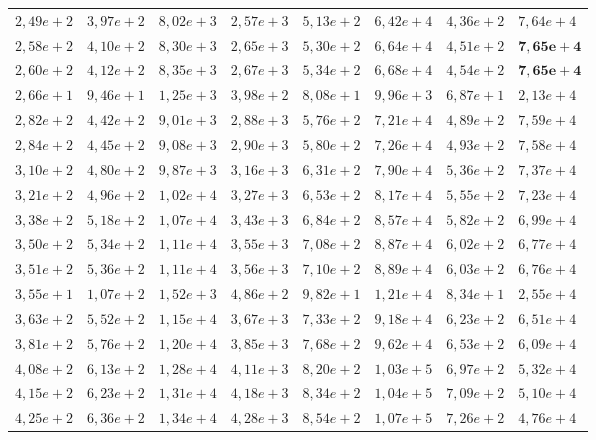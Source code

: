 \documentclass [11pt]{articleSBPO}
\begin{document}
\begin{table}
\begin{tabular}{|m{1.3cm}|m{1.3cm}|m{1.3cm}|m{1.3cm}|m{1.3cm}|m{1.3cm}|m{1.3cm}||m{1.5cm}|}
		 $ 2,49e+2 $ & $ 3,97e+2 $ & $ 8,02e+3 $ & $ 2,57e+3 $ & $ 5,13e+2 $ & $ 6,42e+4 $ & $ 4,36e+2 $ & $ 7,64e+4 $ \\
		 $ 2,58e+2 $ & $ 4,10e+2 $ & $ 8,30e+3 $ & $ 2,65e+3 $ & $ 5,30e+2 $ & $ 6,64e+4 $ & $ 4,51e+2 $ & $ \mathbf{7,65e+4} $ \\
		 $ 2,60e+2 $ & $ 4,12e+2 $ & $ 8,35e+3 $ & $ 2,67e+3 $ & $ 5,34e+2 $ & $ 6,68e+4 $ & $ 4,54e+2 $ & $ \mathbf{7,65e+4} $ \\
		 $ 2,66e+1 $ & $ 9,46e+1 $ & $ 1,25e+3 $ & $ 3,98e+2 $ & $ 8,08e+1 $ & $ 9,96e+3 $ & $ 6,87e+1 $ & $ 2,13e+4 $ \\
		 $ 2,82e+2 $ & $ 4,42e+2 $ & $ 9,01e+3 $ & $ 2,88e+3 $ & $ 5,76e+2 $ & $ 7,21e+4 $ & $ 4,89e+2 $ & $ 7,59e+4 $ \\
		 $ 2,84e+2 $ & $ 4,45e+2 $ & $ 9,08e+3 $ & $ 2,90e+3 $ & $ 5,80e+2 $ & $ 7,26e+4 $ & $ 4,93e+2 $ & $ 7,58e+4 $ \\
		 $ 3,10e+2 $ & $ 4,80e+2 $ & $ 9,87e+3 $ & $ 3,16e+3 $ & $ 6,31e+2 $ & $ 7,90e+4 $ & $ 5,36e+2 $ & $ 7,37e+4 $ \\
		 $ 3,21e+2 $ & $ 4,96e+2 $ & $ 1,02e+4 $ & $ 3,27e+3 $ & $ 6,53e+2 $ & $ 8,17e+4 $ & $ 5,55e+2 $ & $ 7,23e+4 $ \\
		 $ 3,38e+2 $ & $ 5,18e+2 $ & $ 1,07e+4 $ & $ 3,43e+3 $ & $ 6,84e+2 $ & $ 8,57e+4 $ & $ 5,82e+2 $ & $ 6,99e+4 $ \\
		 $ 3,50e+2 $ & $ 5,34e+2 $ & $ 1,11e+4 $ & $ 3,55e+3 $ & $ 7,08e+2 $ & $ 8,87e+4 $ & $ 6,02e+2 $ & $ 6,77e+4 $ \\
		 $ 3,51e+2 $ & $ 5,36e+2 $ & $ 1,11e+4 $ & $ 3,56e+3 $ & $ 7,10e+2 $ & $ 8,89e+4 $ & $ 6,03e+2 $ & $ 6,76e+4 $ \\
		 $ 3,55e+1 $ & $ 1,07e+2 $ & $ 1,52e+3 $ & $ 4,86e+2 $ & $ 9,82e+1 $ & $ 1,21e+4 $ & $ 8,34e+1 $ & $ 2,55e+4 $ \\
		 $ 3,63e+2 $ & $ 5,52e+2 $ & $ 1,15e+4 $ & $ 3,67e+3 $ & $ 7,33e+2 $ & $ 9,18e+4 $ & $ 6,23e+2 $ & $ 6,51e+4 $ \\
		 $ 3,81e+2 $ & $ 5,76e+2 $ & $ 1,20e+4 $ & $ 3,85e+3 $ & $ 7,68e+2 $ & $ 9,62e+4 $ & $ 6,53e+2 $ & $ 6,09e+4 $ \\
		 $ 4,08e+2 $ & $ 6,13e+2 $ & $ 1,28e+4 $ & $ 4,11e+3 $ & $ 8,20e+2 $ & $ 1,03e+5 $ & $ 6,97e+2 $ & $ 5,32e+4 $ \\
		 $ 4,15e+2 $ & $ 6,23e+2 $ & $ 1,31e+4 $ & $ 4,18e+3 $ & $ 8,34e+2 $ & $ 1,04e+5 $ & $ 7,09e+2 $ & $ 5,10e+4 $ \\
		 $ 4,25e+2 $ & $ 6,36e+2 $ & $ 1,34e+4 $ & $ 4,28e+3 $ & $ 8,54e+2 $ & $ 1,07e+5 $ & $ 7,26e+2 $ & $ 4,76e+4 $ \\

\end{tabular}
\end{table}
\end{document}

